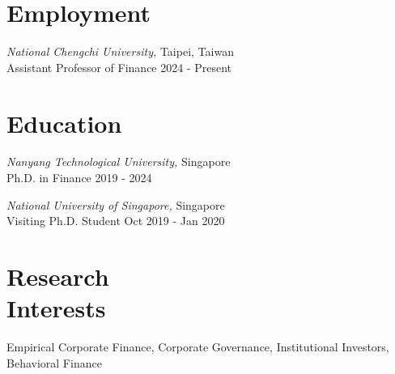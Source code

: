 \documentclass[margin]{res} %
\begin{document}
\begin{resume}

\section{Employment}

{\sl National Chengchi University,} \hfill Taipei, Taiwan \\
Assistant Professor of Finance \hfill  2024 - Present

\section{Education}

{\sl Nanyang Technological University,} \hfill Singapore \\
Ph.D. in Finance \hfill  2019 - 2024

{\sl National University of Singapore,} \hfill Singapore \\
Visiting Ph.D. Student \hfill Oct 2019 - Jan 2020



\section{Research \\ Interests}

Empirical Corporate Finance, Corporate Governance, Institutional Investors, Behavioral Finance


\end{resume}
\end{document}
